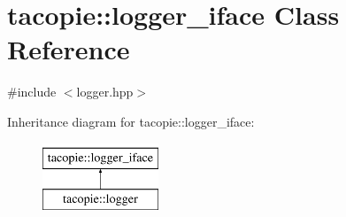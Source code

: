 \hypertarget{classtacopie_1_1logger__iface}{}\section{tacopie\+:\+:logger\+\_\+iface Class Reference}
\label{classtacopie_1_1logger__iface}


{\ttfamily \#include $<$logger.\+hpp$>$}

Inheritance diagram for tacopie\+:\+:logger\+\_\+iface\+:\begin{figure}[H]
\begin{center}
\leavevmode
\includegraphics[height=2.000000cm]{classtacopie_1_1logger__iface}
\end{center}
\end{figure}

